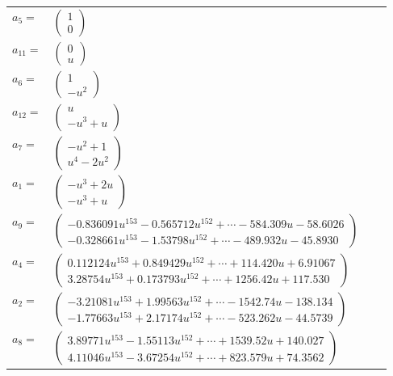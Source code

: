 \documentclass[1p]{elsarticle_modified}
\theoremstyle{definition}
\begin{document}
\begin{tabular}{m{7pt} m{180pt} m{7pt} m{180pt} }
\flushright $a_{5}=$&$\begin{pmatrix}1\\0\end{pmatrix}$ \\
\flushright $a_{11}=$&$\begin{pmatrix}0\\u\end{pmatrix}$ \\
\flushright $a_{6}=$&$\begin{pmatrix}1\\- u^2\end{pmatrix}$ \\
\flushright $a_{12}=$&$\begin{pmatrix}u\\- u^3+u\end{pmatrix}$ \\
\flushright $a_{7}=$&$\begin{pmatrix}- u^2+1\\u^4-2 u^2\end{pmatrix}$ \\
\flushright $a_{1}=$&$\begin{pmatrix}- u^3+2 u\\- u^3+u\end{pmatrix}$ \\
\flushright $a_{9}=$&$\begin{pmatrix}-0.836091 u^{153}-0.565712 u^{152}+\cdots-584.309 u-58.6026\\-0.328661 u^{153}-1.53798 u^{152}+\cdots-489.932 u-45.8930\end{pmatrix}$ \\
\flushright $a_{4}=$&$\begin{pmatrix}0.112124 u^{153}+0.849429 u^{152}+\cdots+114.420 u+6.91067\\3.28754 u^{153}+0.173793 u^{152}+\cdots+1256.42 u+117.530\end{pmatrix}$ \\
\flushright $a_{2}=$&$\begin{pmatrix}-3.21081 u^{153}+1.99563 u^{152}+\cdots-1542.74 u-138.134\\-1.77663 u^{153}+2.17174 u^{152}+\cdots-523.262 u-44.5739\end{pmatrix}$ \\
\flushright $a_{8}=$&$\begin{pmatrix}3.89771 u^{153}-1.55113 u^{152}+\cdots+1539.52 u+140.027\\4.11046 u^{153}-3.67254 u^{152}+\cdots+823.579 u+74.3562\end{pmatrix}$ \\

\end{tabular}
\end{document}
